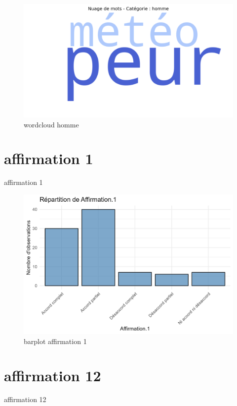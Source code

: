\documentclass[
]{article}
\begin{document}
\begin{figure}
\centering
\includegraphics{Image/wordcloud_homme.png}
\caption{wordcloud homme}
\end{figure}

\section{affirmation 1}\label{affirmation-1}

affirmation 1

\begin{figure}
\centering
\includegraphics{Image/barplot_Affirmation.1.png}
\caption{barplot affirmation 1}
\end{figure}

\section{affirmation 12}\label{affirmation-12}

affirmation 12
\end{document}
